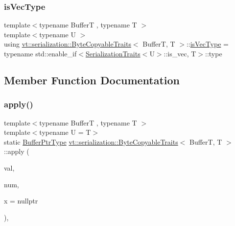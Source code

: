 \mbox{\label{structvt_1_1serialization_1_1_byte_copyable_traits_a99c4b667bd99e2cdaad0e0be5b21af50}} 
\subsubsection{\texorpdfstring{is\+Vec\+Type}{isVecType}}
{\footnotesize\ttfamily template$<$typename BufferT , typename T $>$ \\
template$<$typename U $>$ \\
using \hyperlink{structvt_1_1serialization_1_1_byte_copyable_traits}{vt\+::serialization\+::\+Byte\+Copyable\+Traits}$<$ BufferT, T $>$\+::\hyperlink{structvt_1_1serialization_1_1_byte_copyable_traits_a99c4b667bd99e2cdaad0e0be5b21af50}{is\+Vec\+Type} =  typename std\+::enable\+\_\+if$<$\hyperlink{structvt_1_1serialization_1_1_serialization_traits}{Serialization\+Traits}$<$U$>$\+::is\+\_\+vec, T$>$\+::type}



\subsection{Member Function Documentation}
\mbox{\label{structvt_1_1serialization_1_1_byte_copyable_traits_acff1719ea2b2291b4ef73f03a6edc9c4}} 
\subsubsection{\texorpdfstring{apply()}{apply()}\hspace{0.1cm}{\footnotesize\ttfamily [1/4]}}
{\footnotesize\ttfamily template$<$typename BufferT , typename T $>$ \\
template$<$typename U  = T$>$ \\
static \hyperlink{structvt_1_1serialization_1_1_byte_copyable_traits_ab06bcaa790f4a227936f6d6854d2bf41}{Buffer\+Ptr\+Type} \hyperlink{structvt_1_1serialization_1_1_byte_copyable_traits}{vt\+::serialization\+::\+Byte\+Copyable\+Traits}$<$ BufferT, T $>$\+::apply (\begin{DoxyParamCaption}\item[{T $\ast$}]{val,  }\item[{Size\+Type}]{num,  }\item[{\hyperlink{structvt_1_1serialization_1_1_byte_copyable_traits_a3113636143fcf9ee209752353f9fec3a}{is\+Byte\+Copy\+Type}$<$ U $>$ $\ast$}]{x = {\ttfamily nullptr} }\end{DoxyParamCaption})\hspace{0.3cm}{\ttfamily [inline]}, {\ttfamily [static]}}

